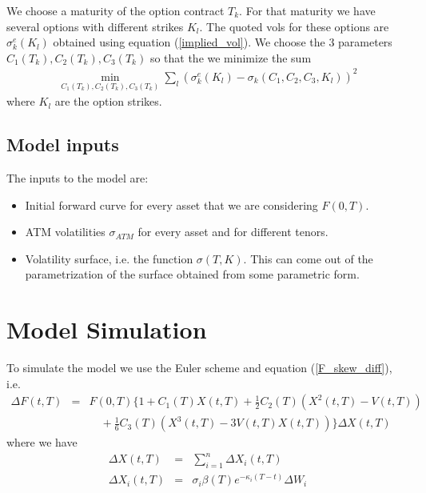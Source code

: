 \documentclass[12pt]{article}
\begin{document}
We choose a maturity of the option contract $T_k$. 
For that maturity we have several options with different 
strikes $K_l$. The quoted vols for these options are 
$\sigma_k ^e (K_l) $ obtained using equation (\ref{implied_vol}). 
We choose the $3$ parameters $C_1 (T_k), C_2 (T_k), C_3 (T_k) $ 
so that the we minimize the sum 
\begin {eqnarray*}
  \min_{C_1(T_k),C_2(T_k),C_3(T_k)} \sum_l 
  (\sigma_k^e (K_l) - \sigma_k (C_1,C_2,C_3,K_l))^2 
\end {eqnarray*}
where $K_l$ are the option strikes.

\subsection {Model inputs} 
\label {section_input_params}

The inputs to the model are:
\begin {itemize}
\item Initial forward curve for every asset that we are considering 
  $F(0,T)$. 

\item ATM volatilities $\sigma_{ATM} $ for every asset and for 
  different tenors.

\item Volatility surface, i.e. the function $\sigma (T,K)$. This can 
  come out of the parametrization of the surface obtained from 
  some parametric form. 

\end {itemize}




\section {Model Simulation}
\label {model_simulation}


To simulate the model we use the Euler scheme and equation 
(\ref{F_skew_diff}), i.e. 
\begin {eqnarray*}
  \Delta F (t, T) & = & F(0,T) \{ 
  1 + C_1 (T) X(t,T) + 
  \frac 1 2 C_2 (T) ( X^2 (t,T) - V(t,T) ) 
  \\
  &  & \quad + 
  \frac 1 6 C_3 (T) ( X^3(t,T) - 3 V(t,T) X(t,T) ) 
  \} \Delta X(t,T) 
\end {eqnarray*}
where we have 
\begin {eqnarray*}
  \Delta X(t,T) & = & \sum_{i=1}^n \Delta X_i (t,T) 
  \\
  \Delta X_i (t,T) & = & \sigma_i \beta (T) e^{-\kappa_i (T-t)} \Delta W_i 
\end {eqnarray*}
\end{document}
